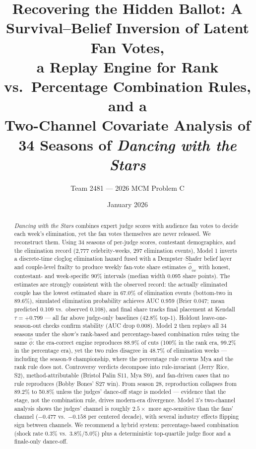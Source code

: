 \documentclass[10pt]{article}
\title{Recovering the Hidden Ballot: A Survival--Belief Inversion of Latent Fan Votes, \\
a Replay Engine for Rank vs.\ Percentage Combination Rules, and a \\
Two-Channel Covariate Analysis of 34 Seasons of \textit{Dancing with the Stars}}
\author{Team 2481 --- 2026 MCM Problem C}
\date{January 2026}
\begin{document}
\maketitle
\tableofcontents
\newpage

\begin{abstract}
\textit{Dancing with the Stars} combines expert judge scores with audience fan votes to
decide each week's elimination, yet the fan votes themselves are never released. We
reconstruct them. Using 34 seasons of per-judge scores, contestant demographics, and the
elimination record (2{,}777 celebrity-weeks, 297 elimination events), Model 1 inverts a
discrete-time cloglog elimination hazard fused with a Dempster--Shafer belief layer and
couple-level frailty to produce weekly fan-vote share estimates $\hat\phi_{iw}$ with
honest, contestant- and week-specific 90\% intervals (median width 0.095 share points).
The estimates are strongly consistent with the observed record: the actually eliminated
couple has the lowest estimated share in 67.0\% of elimination events (bottom-two in
89.6\%), simulated elimination probability achieves AUC 0.959 (Brier 0.047; mean
predicted 0.109 vs.\ observed 0.108), and final share tracks final placement at Kendall
$\tau = +0.799$ --- all far above judge-only baselines (42.8\% top-1). Holdout
leave-one-season-out checks confirm stability (AUC drop 0.008). Model 2 then replays all
34 seasons under the show's rank-based and percentage-based combination rules using the
same $\hat\phi$: the era-correct engine reproduces 88.9\% of cuts (100\% in the rank era,
99.2\% in the percentage era), yet the two rules disagree in 48.7\% of elimination weeks
--- including the season-9 championship, where the percentage rule crowns Mya and the
rank rule does not. Controversy verdicts decompose into rule-invariant (Jerry Rice, S2),
method-attributable (Bristol Palin S11, Mya S9), and fan-driven cases that no rule
reproduces (Bobby Bones' S27 win). From season 28, reproduction collapses from 89.2\%
to 50.8\% unless the judges' dance-off stage is modeled --- evidence that the stage, not
the combination rule, drives modern-era divergence. Model 3's two-channel analysis shows
the judges' channel is roughly $2.5\times$ more age-sensitive than the fans' channel
($-0.477$ vs.\ $-0.158$ per centered decade), with several industry effects flipping sign
between channels. We recommend a hybrid system: percentage-based combination (shock rate
0.3\% vs.\ 3.8\%/5.0\%) plus a deterministic top-quartile judge floor and a
finale-only dance-off.
\end{abstract}
\end{document}
